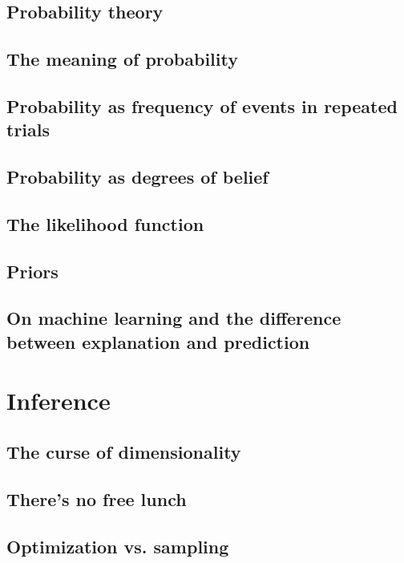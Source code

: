 \documentclass[]{report}
\begin{document}
\subsection{Probability theory}
\subsection{The meaning of probability}
\subsection{Probability as frequency of events in repeated trials}
\subsection{Probability as degrees of belief}
\subsection{The likelihood function}
\subsection{Priors}
\subsection{On machine learning and the difference between explanation and prediction}

\section{Inference}
\subsection{The curse of dimensionality}
\subsection{There's no free lunch}
\subsection{Optimization vs. sampling}
\end{document}

